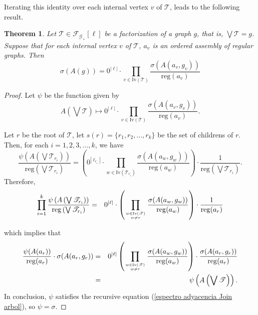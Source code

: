 \documentclass[11pt]{article}
\newtheorem{theorem}{Theorem}[section]
\theoremstyle{definition}
\begin{document}
Iterating this identity over each internal vertex $v$ of $\mathscr{T}$, leads to the following result.

\begin{theorem}\label{adjacency spectrum iterated}
Let $\mathscr{T}\in \mathscr{F}_{\mathscr{G}_+}[\ell]$ be a factorization of a graph $g$, that is, $\displaystyle{\bigvee \mathscr{T}=g}$. Suppose that for each internal vertex $v$ of $\mathscr{T}$, $a_v$ is an ordered assembly of regular graphs. Then
\begin{equation}\label{espectro adyacencia sobre un arbol enriquecido}
\sigma(A(g))=0^{|\ell|}\cdot \prod_{v\in \mathrm{Iv}(\mathscr{T})}\dfrac{\sigma(A(a_v,g_v))}{\mathrm{reg}(a_v)}
\end{equation}
\end{theorem}

\begin{proof}
Let $\psi$ be the function given by
\[A\left(\bigvee \mathscr{T}\right) \mapsto \displaystyle{0^{|\ell|}\cdot \prod_{v\in \mathrm{Iv}(\mathscr{T})}\dfrac{\sigma(A(a_v,g_v))}{\mathrm{reg}(a_v)}}.\]

Let $r$ be the root of $\mathscr{T}$, let $s(r)=\{r_1, r_2,...,r_k\}$ be the set of childrens of $r$. Then, for each $i=1,2,3,...,k$, we have
\begin{equation*}
\dfrac{\psi\left(A\left(\bigvee \mathscr{T}_{r_i}\right)\right)}{\mathrm{reg}\left(\bigvee \mathscr{T}_{r_i}\right)}=\left(0^{|\ell_{r_i}|}\cdot \prod_{w\in \mathrm{Iv}(\mathscr{T}_{r_i})}\dfrac{\sigma(A(a_w,g_w))}{\mathrm{reg}(a_w)}\right)\cdot \dfrac{1}{\mathrm{reg}\left(\bigvee \mathscr{T}_{r_i}\right)}.
\end{equation*}
Therefore,
\begin{eqnarray*}
\prod^k_{i=1} \dfrac{\psi\left(A\left(\bigvee \mathscr{T}_{r_i}\right)\right)}{\mathrm{reg}\left(\bigvee \mathscr{T}_{r_i}\right)}&=&0^{|\ell|}\cdot \left(\prod_{w\in \mathrm{Iv}(\mathscr{T}) \atop w\neq r} \dfrac{\sigma(A(a_w,g_w))}{\mathrm{reg}(a_w)}\right)\cdot \dfrac{1}{\mathrm{reg}(a_r)}
\end{eqnarray*}

which implies that
\begin{eqnarray*}
\dfrac{\psi(A(a_r))}{\mathrm{reg}(a_r)}\cdot \sigma(A(a_r, g_r))&=&0^{|\ell|}\left(\prod_{w\in \mathrm{Iv}(\mathscr{T})\atop w\neq r} \dfrac{\sigma(A(a_w,g_w))}{\mathrm{reg}(a_w)}\right)\cdot \dfrac{\sigma(A(a_r,g_r))}{\mathrm{reg}(a_r)}\\
&=&\psi\left(A\left(\bigvee \mathscr{T}\right)\right).
\end{eqnarray*}
In conclusion, $\psi$ satisfies the recursive equation (\ref{espectro adyacencia Join arbol}), so $\psi=\sigma$.
\end{proof}
\end{document}
